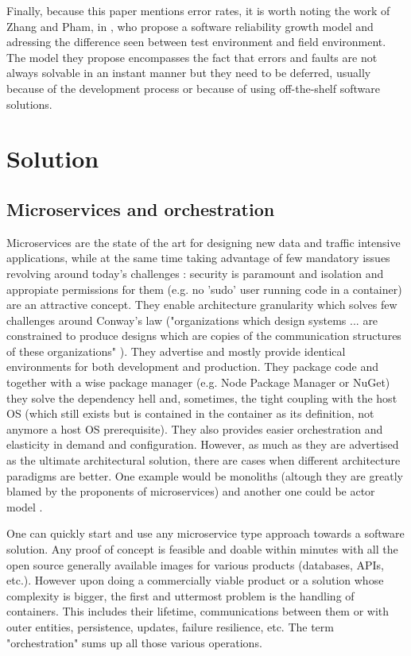 \documentclass[conference]{IEEEtran}
\begin{document}
    Finally, because this paper mentions error rates, it is worth noting the work of Zhang and Pham, in \cite{b2}, who propose a software reliability growth model and adressing the difference seen between test environment and field environment. The model they propose encompasses the fact that errors and faults are not always solvable in an instant manner but they need to be deferred, usually because of the development process or because of using off-the-shelf software solutions.
    
\section{Solution}

\subsection{Microservices and orchestration}
    Microservices are the state of the art for designing new data and traffic intensive applications, while at the same time taking advantage of few mandatory issues revolving around today's challenges \cite{b5}: security is paramount and isolation and appropiate permissions for them (e.g. no 'sudo' user running code in a container) are an attractive concept. They enable architecture granularity which solves few challenges around Conway's law ("organizations which design systems ... are constrained to produce designs which are copies of the communication structures of these organizations" \cite{b4}). They advertise and mostly provide identical environments for both development and production. They package code and together with a wise package manager (e.g. Node Package Manager or NuGet) they solve the dependency hell and, sometimes, the tight coupling with the host OS (which still exists but is contained in the container as its definition, not anymore a host OS prerequisite). They also provides easier orchestration and elasticity in demand and configuration. However, as much as they are advertised as the ultimate architectural solution, there are cases when different architecture paradigms are better. One example would be monoliths \cite{b6} (altough they are greatly blamed by the proponents of microservices) and another one could be actor model \cite{b7}.

    One can quickly start and use any microservice type approach towards a software solution. Any proof of concept is feasible and doable within minutes with all the open source generally available images for various products (databases, APIs, etc.). However upon doing a commercially viable product or a solution whose complexity is bigger, the first and uttermost problem is the handling of containers. This includes their lifetime, communications between them or with outer entities, persistence, updates, failure resilience, etc. The term "orchestration" sums up all those various operations.
    
\end{document}
